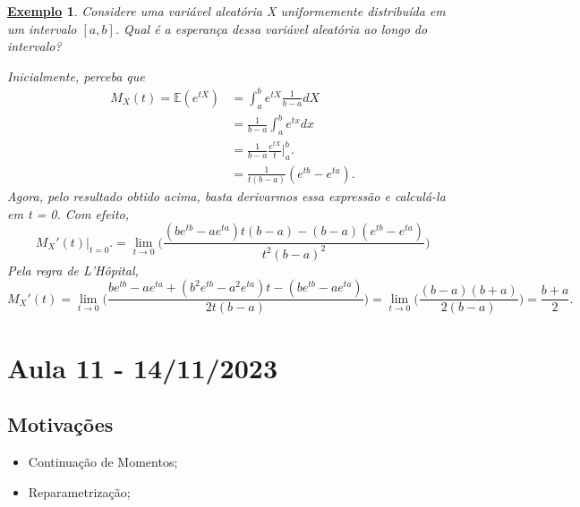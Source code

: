 \documentclass{article}
\newtheorem{example}{\underline{Exemplo}}
\begin{document}
\begin{example}
  Considere uma variável aleatória X uniformemente distribuída em um intervalo \([a, b]\). Qual é a esperança dessa variável aleatória ao longo do intervalo?

  Inicialmente, perceba que 
 \begin{align*}
   M_{X}(t) = \mathbb{E}(e^{tX}) &= \int_{a}^{b}e^{tX}\frac{1}{b-a}dX\\
                                 &= \frac{1}{b-a}\int_{a}^{b}e^{tx}dx\\
                                 &= \frac{1}{b-a}\frac{e^{tX}}{t}\biggl|_{a}^{b}\biggr.\\
                                 &= \frac{1}{t(b-a)}(e^{tb}-e^{ta}).
 \end{align*}
  Agora, pelo resultado obtido acima, basta derivarmos essa expressão e calculá-la em t = 0. Com efeito, 
  \[
    M_{X}'(t)\biggl|_{t=0}^{}\biggr. = \lim_{t\to 0}\biggl(\frac{(b e^{tb}-a e^{ta})t(b-a) - (b-a)(e^{tb}-e^{ta})}{t^{2}(b-a)^{2}}\biggr)  
  \]
  Pela regra de L'Hôpital,
  \[
    M_{X}'(t) = \lim_{t\to 0}\biggl(\frac{be^{tb} - ae^{ta} + (b^{2}e^{tb} - a ^{2}e^{ta})t - (be^{tb}-ae^{ta})}{2t(b-a)}\biggr) = \lim_{t\to 0}\biggl(\frac{(b-a)(b+a)}{2(b-a)}\biggr) = \frac{b+a}{2}.
  \]
\end{example}
\newpage

\section{Aula 11 - 14/11/2023}
\subsection{Motivações}
\begin{itemize}
  \item Continuação de Momentos;
  \item Reparametrização;
\end{itemize}
\end{document}
